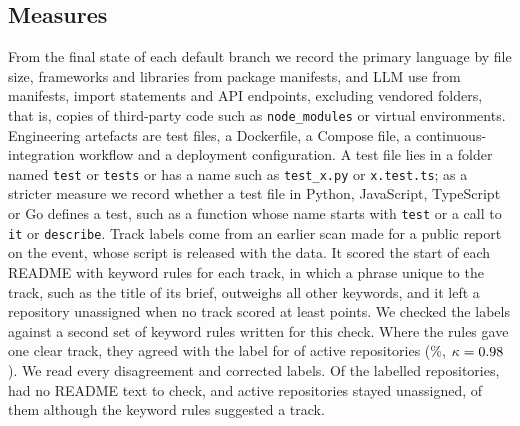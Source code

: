 \documentclass{article}
\begin{document}
\subsection{Measures}\label{sec:measures}
From the final state of each default branch we record the primary language by file size, frameworks and libraries from package manifests, and LLM use from manifests, import statements and API endpoints, excluding vendored folders, that is, copies of third-party code such as \texttt{node\_modules} or virtual environments. Engineering artefacts are test files, a Dockerfile, a Compose file, a continuous-integration workflow and a deployment configuration. A test file lies in a folder named \texttt{test} or \texttt{tests} or has a name such as \texttt{test\_x.py} or \texttt{x.test.ts}; as a stricter measure we record whether a test file in Python, JavaScript, TypeScript or Go defines a test, such as a function whose name starts with \texttt{test} or a call to \texttt{it} or \texttt{describe}. Track labels come from an earlier scan made for a public report on the event, whose script is released with the data. It scored the start of each README with keyword rules for each track, in which a phrase unique to the track, such as the title of its brief, outweighs all other keywords, and it left a repository unassigned when no track scored at least \trackminscore{} points. We checked the labels against a second set of keyword rules written for this check. Where the rules gave one clear track, they agreed with the label for \NValidationTracksKwAgree{} of \NValidationTracksKwDecisive{} active repositories (\NValidationTracksKwAgreePct\%, $\kappa = \num{0.98}$). We read every disagreement and corrected \NRqOneLabelFixes{} labels. Of the labelled repositories, \NValidationTracksKwLabelledNoReadmeText{} had no README text to check, and \NRqOneTrackUnclear{} active repositories stayed unassigned, \NValidationTracksKwUnclearWithKw{} of them although the keyword rules suggested a track.
\end{document}
